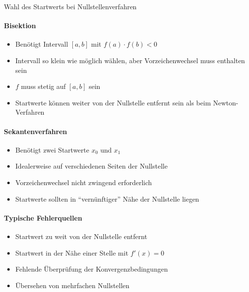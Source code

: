 \begin{KR}{Wahl des Startwerts bei Nullstellenverfahren}
\paragraph{Bisektion}
\begin{itemize}
    \item Benötigt Intervall $[a,b]$ mit $f(a) \cdot f(b) < 0$
    \item Intervall so klein wie möglich wählen, aber Vorzeichenwechsel muss enthalten sein
    \item $f$ muss stetig auf $[a,b]$ sein
    \item Startwerte können weiter von der Nullstelle entfernt sein als beim Newton-Verfahren
\end{itemize}

\paragraph{Sekantenverfahren}
\begin{itemize}
    \item Benötigt zwei Startwerte $x_0$ und $x_1$
    \item Idealerweise auf verschiedenen Seiten der Nullstelle
    \item Vorzeichenwechsel nicht zwingend erforderlich
    \item Startwerte sollten in ``vernünftiger'' Nähe der Nullstelle liegen
\end{itemize}

\paragraph{Typische Fehlerquellen}
\begin{itemize}
    \item Startwert zu weit von der Nullstelle entfernt
    \item Startwert in der Nähe einer Stelle mit $f'(x) = 0$
    \item Fehlende Überprüfung der Konvergenzbedingungen
    \item Übersehen von mehrfachen Nullstellen
\end{itemize}
\end{KR}